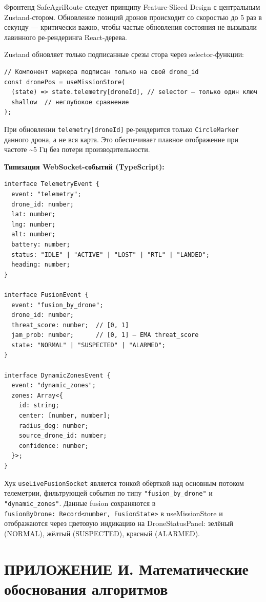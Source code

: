 \documentclass[14pt,a4paper]{extarticle}
\begin{document}
Фронтенд SafeAgriRoute следует принципу Feature-Sliced Design с центральным Zustand-стором. Обновление позиций дронов происходит со скоростью до 5 раз в секунду --- критически важно, чтобы частые обновления состояния не вызывали лавинного ре-рендеринга React-дерева.

Zustand обновляет только подписанные срезы стора через selector-функции:

\begin{verbatim}
// Компонент маркера подписан только на свой drone_id
const dronePos = useMissionStore(
  (state) => state.telemetry[droneId], // selector — только один ключ
  shallow  // неглубокое сравнение
);
\end{verbatim}

При обновлении \texttt{telemetry{[}droneId{]}} ре-рендерится только \texttt{CircleMarker} данного дрона, а не вся карта. Это обеспечивает плавное отображение при частоте \textasciitilde5 Гц без потери производительности.

\textbf{Типизация WebSocket-событий (TypeScript):}

\begin{verbatim}
interface TelemetryEvent {
  event: "telemetry";
  drone_id: number;
  lat: number;
  lng: number;
  alt: number;
  battery: number;
  status: "IDLE" | "ACTIVE" | "LOST" | "RTL" | "LANDED";
  heading: number;
}

interface FusionEvent {
  event: "fusion_by_drone";
  drone_id: number;
  threat_score: number;  // [0, 1]
  jam_prob: number;      // [0, 1] — EMA threat_score
  state: "NORMAL" | "SUSPECTED" | "ALARMED";
}

interface DynamicZonesEvent {
  event: "dynamic_zones";
  zones: Array<{
    id: string;
    center: [number, number];
    radius_deg: number;
    source_drone_id: number;
    confidence: number;
  }>;
}
\end{verbatim}

Хук \texttt{useLiveFusionSocket} является тонкой обёрткой над основным потоком телеметрии, фильтрующей события по типу \texttt{"fusion\_by\_drone"} и \texttt{"dynamic\_zones"}. Данные fusion сохраняются в \texttt{fusionByDrone:\ Record\textless{}number,\ FusionState\textgreater{}} в useMissionStore и отображаются через цветовую индикацию на DroneStatusPanel: зелёный (NORMAL), жёлтый (SUSPECTED), красный (ALARMED).


\hypertarget{ux43fux440ux438ux43bux43eux436ux435ux43dux438ux435-ux438.-ux43cux430ux442ux435ux43cux430ux442ux438ux447ux435ux441ux43aux438ux435-ux43eux431ux43eux441ux43dux43eux432ux430ux43dux438ux44f-ux430ux43bux433ux43eux440ux438ux442ux43cux43eux432}{%
\section{ПРИЛОЖЕНИЕ И. Математические обоснования алгоритмов}\label{ux43fux440ux438ux43bux43eux436ux435ux43dux438ux435-ux438.-ux43cux430ux442ux435ux43cux430ux442ux438ux447ux435ux441ux43aux438ux435-ux43eux431ux43eux441ux43dux43eux432ux430ux43dux438ux44f-ux430ux43bux433ux43eux440ux438ux442ux43cux43eux432}}
\end{document}
